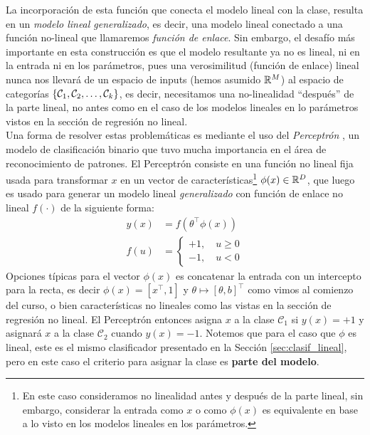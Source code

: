 La incorporación de esta función que conecta el modelo lineal con la clase, resulta en un \emph{modelo lineal generalizado}, es decir, una modelo lineal conectado a una  función no-lineal que llamaremos \emph{función de enlace}. Sin embargo, el desafío más importante en esta construcción es que el modelo resultante ya no es lineal, ni en la entrada ni en los parámetros, pues una verosimilitud (función de enlace) lineal nunca nos llevará de un espacio de inputs (hemos asumido $\mathbb{R}^M$) al espacio de categorías $\{{\mathcal C}_1,{\mathcal C}_2,\ldots,{\mathcal C}_k\}$, es decir, necesitamos una no-linealidad ``después'' de la parte lineal, no antes como en el caso de los modelos lineales en lo parámetros vistos en la sección de regresión no lineal.\\

Una forma de resolver estas problemáticas es mediante el uso del \emph{Perceptrón} \cite{rosenblatt_1958}, un modelo de clasificación binario que tuvo mucha importancia en el área de reconocimiento de patrones. El Perceptrón consiste en una función no lineal fija usada para transformar $x$ en un vector de características\footnote{En este caso consideramos no linealidad antes y después de la parte lineal, sin embargo, considerar la entrada como $x$ o  como $\phi(x)$ es  equivalente en base a lo  visto en los modelos lineales en los parámetros. } $\phi(x)\in\mathbb{R}^D$, que luego es usado para generar un modelo lineal \emph{generalizado} con función de enlace no lineal $f(\cdot)$ de la siguiente forma:
\begin{align}
	y(x) &= f(\theta^\top\phi(x))\\
	f(u) &= \left\{\begin{matrix}
	+1,\quad u\geq 0\\
	-1,\quad u<0
	\end{matrix}\right.
\end{align}
Opciones típicas para el vector $\phi(x)$ es concatenar la entrada con un intercepto para la recta, es decir $\phi(x) = [x^\top, 1]$ y $\theta \mapsto [\theta,b]^\top$ como vimos al comienzo del curso, o bien características no lineales como las vistas en la sección de regresión no lineal. El Perceptrón entonces asigna $x$ a la clase $\mathcal{C}_1$ si $y(x)=+1$ y asignará $x$ a la clase $\mathcal{C}_2$ cuando $y(x)=-1$. Notemos que  para  el caso que $\phi$ es lineal, este es el mismo clasificador presentado en la Sección \ref{sec:clasif_lineal}, pero en este caso el criterio para asignar la clase es \textbf{parte del modelo}.\\

